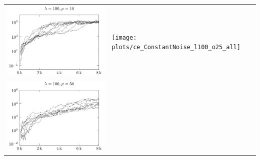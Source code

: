 \begin{tabular}{@{}l@{}l@{}}
\includegraphics[scale=1]{plots/ce_ConstantNoise_l100_o10_all} &
\texttt{[image: plots/ce\_ConstantNoise\_l100\_o25\_all]} \\
\includegraphics[scale=1]{plots/ce_ConstantNoise_l100_o50_all}
\end{tabular}

